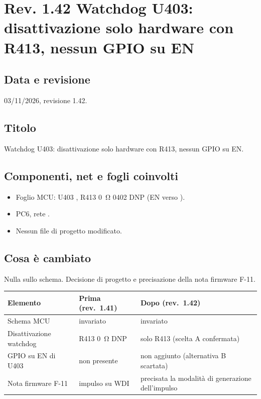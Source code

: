 \clearpage
\section[Rev. 1.42 -- Watchdog U403: disattivazione solo hardware]{Rev. 1.42 \textendash{} Watchdog U403: disattivazione solo hardware con R413, nessun GPIO su EN}

\subsection{Data e revisione}
03/11/2026, revisione 1.42.

\subsection{Titolo}
Watchdog U403: disattivazione solo hardware con R413, nessun GPIO su EN.

\subsection{Componenti, net e fogli coinvolti}
\begin{itemize}
\item Foglio MCU: U403 , R413 \SI{0}{\ohm} 0402 DNP (EN verso ).
\item PC6, rete .
\item Nessun file di progetto modificato.
\end{itemize}

\subsection{Cosa è cambiato}
Nulla sullo schema. Decisione di progetto e precisazione della nota firmware F-11.

{\small{}
\begin{tabular}{@{}lll@{}}
\toprule
\textbf{Elemento} & \textbf{Prima (rev.\ 1.41)} & \textbf{Dopo (rev.\ 1.42)}\\
\midrule
Schema MCU & invariato & invariato\\
Disattivazione watchdog & R413 \SI{0}{\ohm} DNP & solo R413 (scelta A confermata)\\
GPIO su EN di U403 & non presente & non aggiunto (alternativa B scartata)\\
Nota firmware F-11 & impulso su WDI & precisata la modalit\`a di generazione dell'impulso\\
\bottomrule
\end{tabular}}

